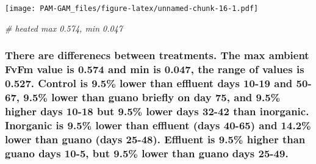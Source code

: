 \documentclass[
]{article}
\newenvironment{Shaded}{\begin{snugshade}}{\end{snugshade}}
\newcommand{\AttributeTok}[1]{\textcolor[rgb]{0.13,0.29,0.53}{#1}}
\newcommand{\CommentTok}[1]{\textcolor[rgb]{0.56,0.35,0.01}{\textit{#1}}}
\newcommand{\DecValTok}[1]{\textcolor[rgb]{0.00,0.00,0.81}{#1}}
\newcommand{\FunctionTok}[1]{\textcolor[rgb]{0.13,0.29,0.53}{\textbf{#1}}}
\newcommand{\NormalTok}[1]{#1}
\newcommand{\SpecialCharTok}[1]{\textcolor[rgb]{0.81,0.36,0.00}{\textbf{#1}}}
\begin{document}
\begin{Shaded}
\end{Shaded}

\texttt{[image: PAM-GAM\_files/figure-latex/unnamed-chunk-16-1.pdf]}

\begin{Shaded}
\begin{Highlighting}[]
\CommentTok{\# heated max 0.574, min 0.047}
\end{Highlighting}
\end{Shaded}

\hypertarget{there-are-differenecs-between-treatments.-the-max-ambient-fvfm-value-is-0.574-and-min-is-0.047-the-range-of-values-is-0.527.-control-is-9.5-lower-than-effluent-days-10-19-and-50-67-9.5-lower-than-guano-briefly-on-day-75-and-9.5-higher-days-10-18-but-9.5-lower-days-32-42-than-inorganic.-inorganic-is-9.5-lower-than-effluent-days-40-65-and-14.2-lower-than-guano-days-25-48.-effluent-is-9.5-higher-than-guano-days-10-5-but-9.5-lower-than-guano-days-25-49.}{%
\subsubsection{There are differenecs between treatments. The max ambient
FvFm value is 0.574 and min is 0.047, the range of values is 0.527.
Control is 9.5\% lower than effluent days 10-19 and 50-67, 9.5\% lower
than guano briefly on day 75, and 9.5\% higher days 10-18 but 9.5\%
lower days 32-42 than inorganic. Inorganic is 9.5\% lower than effluent
(days 40-65) and 14.2\% lower than guano (days 25-48). Effluent is 9.5\%
higher than guano days 10-5, but 9.5\% lower than guano days
25-49.}\label{there-are-differenecs-between-treatments.-the-max-ambient-fvfm-value-is-0.574-and-min-is-0.047-the-range-of-values-is-0.527.-control-is-9.5-lower-than-effluent-days-10-19-and-50-67-9.5-lower-than-guano-briefly-on-day-75-and-9.5-higher-days-10-18-but-9.5-lower-days-32-42-than-inorganic.-inorganic-is-9.5-lower-than-effluent-days-40-65-and-14.2-lower-than-guano-days-25-48.-effluent-is-9.5-higher-than-guano-days-10-5-but-9.5-lower-than-guano-days-25-49.}}
\end{document}
